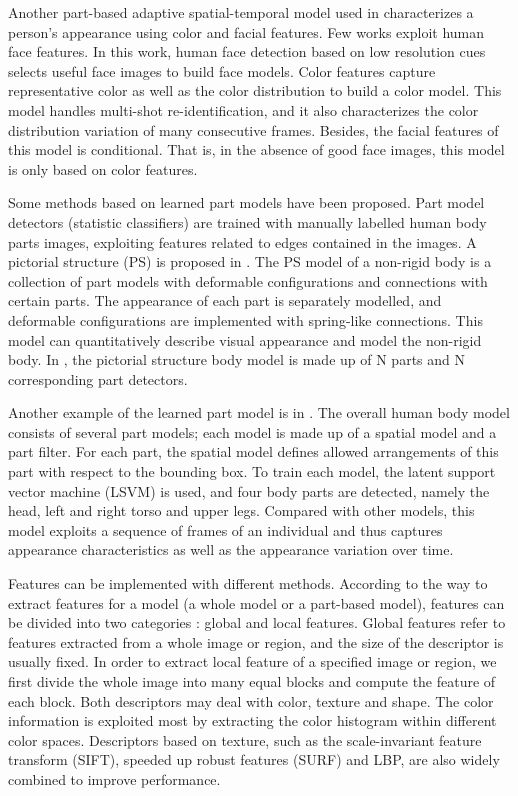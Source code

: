 \indent Another part-based adaptive spatial-temporal model used in \cite{PartbasedSTReid} characterizes a person's appearance using color and facial features. Few works exploit human face features. In this work, human face detection based on low resolution cues selects useful face images to build face models. Color features capture representative color as well as the color distribution to build a color model. This model handles multi-shot re-identification, and it also characterizes the color distribution variation of many consecutive frames.  Besides, the facial features of this model is conditional. That is, in the absence of good face images, this model is only based on color features.

Some methods based on learned part models have been proposed. Part model detectors (statistic classifiers) are trained with manually labelled human body parts images, exploiting features related to edges contained in the images. A pictorial structure (PS) is proposed in \cite{PictorialModel}. The PS model of a non-rigid body is a collection of part models with deformable configurations and connections with certain parts. The appearance of each part is separately modelled, and deformable configurations are implemented with spring-like connections. This model can quantitatively describe visual appearance and model the non-rigid body. In \cite{PSmodelRevisit}, the pictorial structure body model is made up of N parts and N corresponding part detectors. 

Another example of the learned part model is in \cite{MultiPersonREID, PartbasedSTReid}. The overall human body model consists of several part models; each model is made up of a spatial model and a part filter. For each part, the spatial model defines allowed arrangements of this part with respect to the bounding box. To train each model, the latent support vector machine (LSVM) is used, and four body parts are detected, namely the head, left and right torso and upper legs. Compared with other models, this model exploits a sequence of frames of an individual and thus captures appearance characteristics as well as the appearance variation over time.

Features can be implemented with different methods. According to the way to extract features for a model (a whole model or a part-based model), features can be divided into two categories \cite{Appearancedesc}: global and local features. Global features refer to features extracted from a whole image or region, and the size of the descriptor is usually fixed. In order to extract local feature of a specified image or region, we first divide the whole image into many equal blocks and compute the feature of each block.  Both descriptors may deal with color, texture and shape. The color information is exploited most by extracting the color histogram within different color spaces. Descriptors based on texture, such as the scale-invariant feature transform (SIFT), speeded up robust features (SURF) and LBP, are also widely combined to improve performance.

